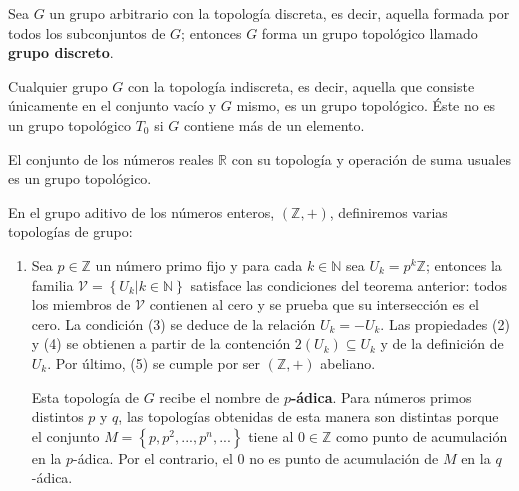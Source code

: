 \documentclass[12pt]{report}
\theoremstyle{largebreak}
\begin{document}
    \begin{exa}
        Sea $G$ un grupo arbitrario con la topología discreta, es decir, aquella formada por todos los subconjuntos de $G$; entonces $G$ forma un grupo topológico llamado \textbf{grupo discreto}.
    \end{exa}

    \begin{exa}
        Cualquier grupo $G$ con la topología indiscreta, es decir, aquella que consiste únicamente en el conjunto vacío y $G$ mismo, es un grupo topológico. Éste no es un grupo topológico $T_0$ si $G$ contiene más de un elemento. 
    \end{exa}

    \begin{exa}
        El conjunto de los números reales $\mathbb{R}$ con su topología y operación de suma usuales es un grupo topológico.
    \end{exa}

    \begin{exa}
        En el grupo aditivo de los números enteros, $(\mathbb{Z},+)$, definiremos varias topologías de grupo:
        \begin{enumerate}
            \item Sea $p\in\mathbb{Z}$ un número primo fijo y para cada $k\in\mathbb{N}$ sea $U_k=p^k\mathbb{Z}$; entonces la familia $\mathcal{V}=\left\{U_k\big|k\in\mathbb{N} \right\}$ satisface las condiciones del teorema anterior: todos los miembros de $\mathcal{V}$ contienen al cero y se prueba que su intersección es el cero. La condición (3) se deduce de la relación $U_k=-U_k$.
            Las propiedades (2) y (4) se obtienen a partir de la contención $2(U_k)\subseteq U_k$ y de la definición de $U_k$. Por último, (5) se cumple por ser $(\mathbb{Z},+)$ abeliano.

            Esta topología de $G$ recibe el nombre de \textbf{$p$-ádica}. Para números primos distintos $p$ y $q$, las topologías obtenidas de esta manera son distintas porque el conjunto $M=\left\{p,p^2,...,p^n,...\right\}$ tiene al $0\in\mathbb{Z}$ como punto de acumulación en la $p$-ádica. Por el contrario, el $0$ no es punto de acumulación de $M$ en la $q$-ádica.
        \end{enumerate}
    \end{exa}
\end{document}
